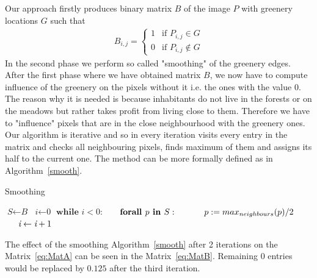 \documentclass[letterpaper]{article}
\begin{document}
\indent Our approach firstly produces binary matrix $B$ of the image $P$ with greenery locations $G$ such that
\newline
\begin{align*}
B_{i,j} = \begin{cases} 1 & \text{if } P_{i,j} \in G\\
                         0 & \text{if } P_{i,j} \notin G
\end{cases}
\end{align*}
\newline
In the second phase we perform so called "smoothing" of the greenery edges. After the first phase where we have obtained matrix $B$,
we now have to compute influence of the greenery on the pixels without it i.e. the ones with the value 0. The reason why it is needed is
because inhabitants do not live in the forests or on the meadows but rather takes profit from living close to them. Therefore we have
to "influence" pixels that are in the close neighbourhood with the greenery ones. Our algorithm is iterative and so in every iteration
visits every entry in the matrix and checks all neighbouring pixels, finds maximum of them and assigns its half to the current one.
The method can be more formally defined as in Algorithm~\ref{smooth}.

\begin{algorithm}
    \caption{Smoothing}\label{smooth}
    \begin{algorithmic}[1]
    \State $\textit{S} \gets \textit{B}$
    \State $\textit{i} \gets \textit{0}$
    \State $\textbf{while } \textit{i} < 0:$
    \State $\indent \textbf{forall } p \textbf{ in } S:$
    \State $\indent \indent p := max_{neighbours}(p) / 2$
    \State $\indent \textit{i} \gets \textit{i} + 1$
    \EndProcedure
    \end{algorithmic}
    \end{algorithm}

The effect of the smoothing Algorithm~\ref{smooth} after 2 iterations on the Matrix~\ref{eq:MatA}
can be seen in the Matrix~\ref{eq:MatB}. Remaining $0$ entries would be replaced by $0.125$ after
the third iteration.
\end{document}
